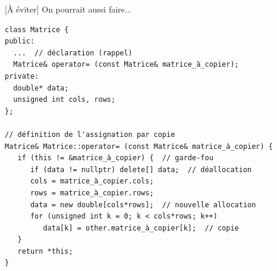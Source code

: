 \documentclass[c]{beamer}
\begin{document}

\begin{frame}[fragile]{[À éviter] On pourrait aussi faire...}

\begin{verbatim}
class Matrice {
public:
  ...  // déclaration (rappel)
  Matrice& operator= (const Matrice& matrice_à_copier);
private:
  double* data;
  unsigned int cols, rows;
};

// définition de l'assignation par copie
Matrice& Matrice::operator= (const Matrice& matrice_à_copier) {
   if (this != &matrice_à_copier) {  // garde-fou
      if (data != nullptr) delete[] data;  // déallocation
      cols = matrice_à_copier.cols;
      rows = matrice_à_copier.rows;
      data = new double[cols*rows];  // nouvelle allocation
      for (unsigned int k = 0; k < cols*rows; k++)
         data[k] = other.matrice_à_copier[k];  // copie
   }
   return *this;
}
\end{verbatim}

\end{frame}





\end{document}
